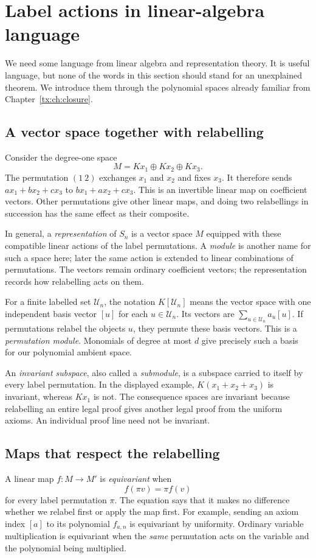\section{Label actions in linear-algebra language}\label{tx:sec:action-primer}
We need some language from linear algebra and representation theory.
It is useful language, but none of the words in this section should
stand for an unexplained theorem. We introduce them through the
polynomial spaces already familiar from Chapter~\ref{tx:ch:closure}.

\subsection{A vector space together with relabelling}
Consider the degree-one space
\[
                  M=Kx_1\oplus Kx_2\oplus Kx_3.
\]
The permutation $(1\ 2)$ exchanges $x_1$ and $x_2$ and fixes $x_3$.
It therefore sends
$a x_1+b x_2+c x_3$ to $b x_1+a x_2+c x_3$.
This is an invertible linear map on coefficient vectors. Other
permutations give other linear maps, and doing two relabellings in
succession has the same effect as their composite.

In general, a \emph{representation} of $S_n$ is a vector space $M$
equipped with these compatible linear actions of the label
permutations. A \emph{module} is another name for such a space here;
later the same action is extended to linear combinations of permutations.
The vectors remain ordinary coefficient vectors; the representation
records how relabelling acts on them.

For a finite labelled set $\mathcal U_n$, the notation $K[\mathcal U_n]$
means the vector space with one independent basis vector $[u]$ for
each $u\in\mathcal U_n$. Its vectors are
$\sum_{u\in\mathcal U_n}a_u[u]$. If permutations relabel the objects
$u$, they permute these basis vectors. This is a \emph{permutation
module}. Monomials of degree at most $d$ give precisely such a basis
for our polynomial ambient space.

An \emph{invariant subspace}, also called a \emph{submodule}, is a
subspace carried to itself by every label permutation. In the displayed
example, $K(x_1+x_2+x_3)$ is invariant, whereas $Kx_1$ is not.
The consequence spaces are invariant because relabelling an entire
legal proof gives another legal proof from the uniform axioms.
An individual proof line need not be invariant.

\subsection{Maps that respect the relabelling}
A linear map $f:M\to M'$ is \emph{equivariant} when
\[
                         f(\pi v)=\pi f(v)
\]
for every label permutation $\pi$. The equation says that it makes
no difference whether we relabel first or apply the map first.
For example, sending an axiom index $[a]$ to its polynomial $f_{a,n}$
is equivariant by uniformity. Ordinary variable multiplication is
equivariant when the \emph{same} permutation acts on the variable
and the polynomial being multiplied.

